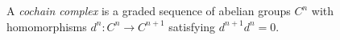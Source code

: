 
A \emph{cochain complex} is a graded sequence of abelian groups $C^n$ with homomorphisms $d^n:C^n\to C^{n+1}$ satisfying $d^{n+1}d^n=0$.
